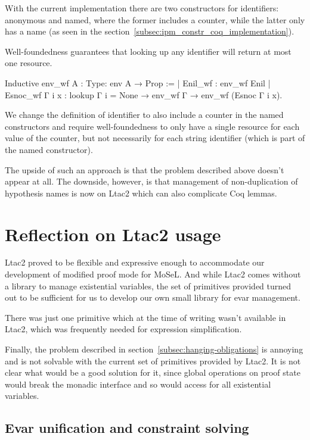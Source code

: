 With the current implementation there are two constructors for identifiers: anonymous and named, where the former includes a counter, while the latter only has a name (as seen in the section~\ref{subsec:ipm_constr_coq_implementation}).

Well-foundedness guarantees that looking up any identifier will return at most one resource.
\begin{coq}
  Inductive env_wf {A : Type}: env A → Prop :=
  | Enil_wf : env_wf Enil
  | Esnoc_wf Γ i x : lookup Γ i = None → env_wf Γ → env_wf (Esnoc Γ i x).
\end{coq}

We change the definition of identifier to also include a counter in the named constructors and require well-foundedness to only have a single resource for each value of the counter, but not necessarily for each string identifier (which is part of the named constructor).

The upside of such an approach is that the problem described above doesn't appear at all.
The downside, however, is that management of non-duplication of hypothesis names is now on Ltac2 which can also complicate Coq lemmas.

\section{Reflection on Ltac2 usage}

Ltac2 proved to be flexible and expressive enough to accommodate our development of modified proof mode for MoSeL.
And while Ltac2 comes without a library to manage existential variables, the set of primitives provided turned out to be sufficient for us to develop our own small library for evar management.

There was just one primitive which at the time of writing wasn't available in Ltac2,  which was frequently needed for expression simplification.

Finally, the problem described in section~\ref{subsec:hanging-obligations} is annoying and is not solvable with the current set of primitives provided by Ltac2.
It is not clear what would be a good solution for it, since global operations on proof state would break the monadic interface and so would access for all existential variables.

\subsection{Evar unification and constraint solving}
\label{subsec:evar-unification-and-constr-solving}

